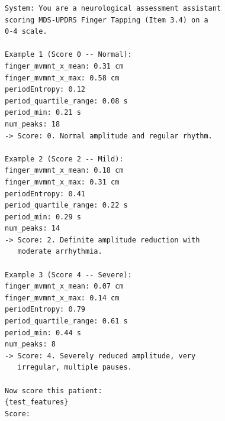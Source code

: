 \documentclass[conference]{IEEEtran}
\begin{document}
{\footnotesize
\begin{verbatim}
System: You are a neurological assessment assistant
scoring MDS-UPDRS Finger Tapping (Item 3.4) on a
0-4 scale.

Example 1 (Score 0 -- Normal):
finger_mvmnt_x_mean: 0.31 cm
finger_mvmnt_x_max: 0.58 cm
periodEntropy: 0.12
period_quartile_range: 0.08 s
period_min: 0.21 s
num_peaks: 18
-> Score: 0. Normal amplitude and regular rhythm.

Example 2 (Score 2 -- Mild):
finger_mvmnt_x_mean: 0.18 cm
finger_mvmnt_x_max: 0.31 cm
periodEntropy: 0.41
period_quartile_range: 0.22 s
period_min: 0.29 s
num_peaks: 14
-> Score: 2. Definite amplitude reduction with
   moderate arrhythmia.

Example 3 (Score 4 -- Severe):
finger_mvmnt_x_mean: 0.07 cm
finger_mvmnt_x_max: 0.14 cm
periodEntropy: 0.79
period_quartile_range: 0.61 s
period_min: 0.44 s
num_peaks: 8
-> Score: 4. Severely reduced amplitude, very
   irregular, multiple pauses.

Now score this patient:
{test_features}
Score:
\end{verbatim}
}

\fi %
\end{document}
